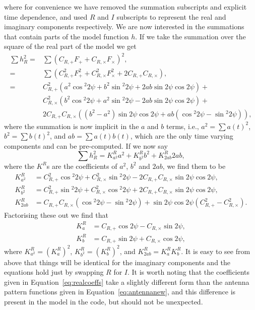 where for convenience we have removed the summation subscripts and explicit time dependence, and used $R$ and $I$ subscripts to represent the real and imaginary components respectively. We are now interested in the summations that contain parts of the model function $h$. If we take the summation over the square of the real part of the model we get
\begin{align}\label{eq:exlikepart}
\sum h_R^2 =& \sum \left(C_{R,+} F_+ + C_{R,\times} F_{\times} \right)^2, \nonumber \\
 = & \sum \left(C_{R,+}^2 F_+^2 + C_{R,\times}^2 F_{\times}^2 + 2C_{R,+}C_{R,\times}\right), \nonumber \\
 = & C_{R,+}^2 \left(a^2 \cos{}^2{2\psi} + b^2 \sin{}^2{2\psi} + 2ab\sin{2\psi}\cos{2\psi}\right) + \nonumber \\
 & C_{R,\times}^2 \left(b^2 \cos{}^2{2\psi} + a^2\sin{}^2{2\psi} - 2ab\sin{2\psi}\cos{2\psi} \right) + \nonumber \\
 & 2C_{R,+}C_{R,\times}\left( (b^2 - a^2)\sin{2\psi}\cos{2\psi} + ab(\cos{}^2{2\psi} - \sin{}^2{2\psi}) \right),
\end{align}
where the summation is now implicit in the $a$ and $b$ terms, i.e., $a^2 = \sum a(t)^2$, $b^2 = \sum b(t)^2$, and $ab = \sum a(t)b(t)$, which are the only time varying components
and can be pre-computed. If we now say
\begin{equation}
\sum h_R^2 = K_{a^2}^Ra^2 + K_{b^2}^Rb^2 + K_{2ab}^R2ab,
\end{equation}
where the $K^R$s are the coefficients of $a^2$, $b^2$ and $2ab$, we find them to be
\begin{align}
K_{a^2}^R & = C_{R,+}^2 \cos{}^2{2\psi} + C_{R,\times}^2\sin{}^2{2\psi} - 2C_{R,+}C_{R,\times}\sin{2\psi}\cos{2\psi}, \nonumber \\
K_{b^2}^R & = C_{R,+}^2 \sin{}^2{2\psi} + C_{R,\times}^2\cos{}^2{2\psi} + 2C_{R,+}C_{R,\times}\sin{2\psi}\cos{2\psi}, \nonumber \\
K_{2ab}^R & = C_{R,+}C_{R,\times}\left(\cos{}^2{2\psi} - \sin{}^2{2\psi} \right) + \sin{2\psi}\cos{2\psi}\left(C_{R,+}^2 - C_{R,\times}^2\right).
\end{align}
Factorising these out we find that
\begin{align}\label{eq:realcoeffs}
K_{a}^R &= C_{R,+}\cos{2\psi} - C_{R,\times}\sin{2\psi}, \nonumber \\
K_{b}^R &= C_{R,+}\sin{2\psi} + C_{R,\times}\cos{2\psi},
\end{align}
where $K_{a^2}^R = \left(K_{a}^R\right)^2$, $K_{b^2}^R = \left(K_{b}^R\right)^2$, and $K_{2ab}^R = K_{a}^RK_{b}^R$.
It is easy to see from above that things will be identical for the imaginary components and the equations hold just
by swapping $R$ for $I$.
It is worth noting that the coefficients given in Equation~\ref{eq:realcoeffs} take a slightly different form than
the antenna pattern functions given in Equation~\ref{eq:antennanew}, and this difference is present in the model
in the \lppen code, but should not be unexpected.


